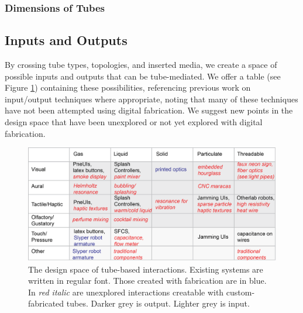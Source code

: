 \subsubsection{Dimensions of Tubes}


\subsection{Inputs and Outputs}


By crossing tube types, topologies, and inserted media, we create a space of possible inputs and outputs that can be tube-mediated.  We offer a table (see Figure \ref{fig:designspace}) containing these possibilities, referencing previous work on input/output techniques where appropriate, noting that many of these techniques have not been attempted using digital fabrication.  We suggest new points in the design space that have been unexplored or not yet explored with digital fabrication.

\begin{figure}[t]
\centering
    \includegraphics[width=\textwidth]{figures/designspace.png}
\caption{The design space of tube-based interactions.  Existing systems are written in regular font.  Those created with fabrication are in {\color{blue}blue}. In \emph{{\color{red}red italic}} are unexplored interactions creatable with custom-fabricated tubes.  Darker grey is output.  Lighter grey is input.  }
\label{fig:designspace}
\end{figure}

